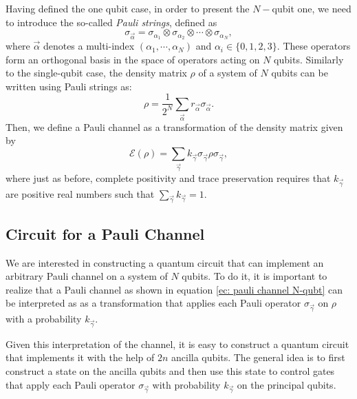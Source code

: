 Having defined the one qubit case, 
in order to present the $N-$qubit one, we 
need to introduce the so-called \textit{Pauli strings}, defined as
\begin{equation}
\label{ec: Density matrix Nqbit}
\sigma_{\vec{\alpha}} = \sigma_{\alpha_1} \otimes \sigma_{\alpha_2}\otimes \cdots \otimes \sigma_{\alpha_N},
\end{equation}
where $\vec{\alpha}$ denotes a multi-index $(\alpha_1, \cdots, \alpha_N)$
 and $\alpha_i \in \{0,1,2,3\}$. 
 These operators form an orthogonal basis in the space of operators acting on $N$ qubits. 
 Similarly to the single-qubit case, the density matrix $\rho$ 
of a system of $N$ qubits can be written using Pauli strings as:
\begin{equation}
\label{ec:cap2-1}
\rho = \dfrac{1}{2^N} \sum_{\vec{\alpha}} r_{\vec{\alpha}} \sigma_{\vec{\alpha}}.
\end{equation}
Then, we define a Pauli channel as a transformation of the density 
matrix given by
\begin{equation}
\label{ec: pauli channel N-qubt}
\mathcal{E}(\rho) = \sum_{\vec{\gamma}} k_{\vec{\gamma}} \sigma_{\vec{\gamma}} \rho \sigma_{\vec{\gamma}},
\end{equation}
where just as before, complete positivity and trace preservation requires
that $k_{\vec{\gamma}}$ are positive real numbers such 
that $\sum_{\vec{\gamma}} k_{\vec{\gamma}}=1$.

\subsection{Circuit for a Pauli Channel}

We are interested in constructing a quantum circuit that can implement an
arbitrary Pauli channel on a system of $N$ qubits. 
To do it, it is important to realize that a Pauli channel
 as shown in equation \ref{ec: pauli channel N-qubt}  can 
be interpreted as as a transformation that applies
each Pauli operator $\sigma_{\vec{\gamma}}$ on $\rho$ with a probability $k_{\vec{\gamma}}$.

Given this interpretation of the channel, 
it is easy to construct a quantum circuit that implements 
it with the help of $2n$ ancilla qubits.
The general idea is to first construct a state on the ancilla qubits
and then use this state to control gates that 
apply each Pauli operator $\sigma_{\vec{\gamma}}$ with probability $k_{\vec{\gamma}}$ 
on the principal qubits. 

